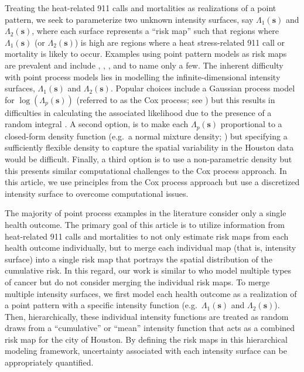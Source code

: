 \documentclass[final]{statsoc}
\begin{document}
Treating the heat-related 911 calls and mortalities as realizations of a point pattern, we seek to parameterize two unknown intensity surfaces, say $\Lambda_1(\mathbf{s})$ and $\Lambda_2(\mathbf{s})$, where each surface represents a ``risk map'' such that regions where $\Lambda_1(\mathbf{s})$ (or $\Lambda_2(\mathbf{s})$) is high are regions where a heat stress-related 911 call or mortality is likely to occur.  
Examples using point pattern models as risk maps are prevalent and include 
\cite{Best2000}, \cite{Chakraborty2011}, \cite{Heaton2014}, and 
\cite{Heaton2015} to name only a few. The inherent difficulty with point process models lies in modelling the infinite-dimensional intensity surfaces, $\Lambda_1(\mathbf{s})$ and $\Lambda_2(\mathbf{s})$.  Popular choices include a Gaussian process model for $\log(\Lambda_p(\mathbf{s}))$ (referred to as the Cox process; see \citealt{Isham:2010}) but this results in difficulties in calculating the associated likelihood due to the presence of a random integral \citep{Liang2009}.  A second option, is to make each $\Lambda_p(\mathbf{s})$ proportional to a closed-form density function (e.g.\ a normal mixture density; \citealt{Chakraborty:EtAl:2010}) but specifying a sufficiently flexible density to capture the spatial variability in the Houston data would be difficult.  Finally, a third option is to use a non-parametric density \citep{Kottas:Sanso:2007} but this presents similar computational challenges to the Cox process approach.  In this article, we use principles from the Cox process approach but use a discretized intensity surface to overcome computational issues.

The majority of point process examples in the literature
consider only a single health outcome. The primary goal of this article is to utilize information
from heat-related 911 calls and mortalities to not only estimate
risk maps from each health outcome individually, but to merge each
individual map (that is, intensity surface) into a single risk map that 
portrays the spatial distribution of the cumulative risk. In this regard, our 
work is similar to \cite{Liang2009} who model multiple types of cancer but 
do not consider merging the individual risk maps. To merge multiple intensity 
surfaces, we first model each health outcome as a 
realization of a point pattern with a specific intensity function (e.g.\ $\Lambda_1(\mathbf{s})$ and $\Lambda_2(\mathbf{s})$).  Then,
hierarchically, these individual intensity functions are treated as 
random draws from a ``cumulative'' or ``mean'' intensity function that
acts as a combined risk map for the city of Houston. By defining the
risk maps in this hierarchical modeling framework, uncertainty associated
with each intensity surface can be appropriately quantified.
\end{document}
